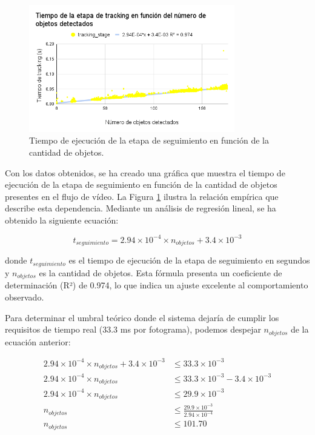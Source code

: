 \documentclass[11pt,spanish,listoffigures,listoftables]{tfgetsinf}
\begin{document}
\begin{figure}[H]
   \centering
   \includegraphics[width=0.8\textwidth]{images/analisis_de_la_solucion/cantidad_objetos/tiempo_etapa_tracking_cantidad_objetos.png}
   \caption{Tiempo de ejecución de la etapa de seguimiento en función de la cantidad de objetos.}
   \label{fig:tiempo_etapa_tracking_cantidad_objetos}
\end{figure}

Con los datos obtenidos, se ha creado una gráfica que muestra el tiempo de ejecución de la etapa de seguimiento en función de la cantidad de objetos presentes en el flujo de vídeo. La Figura \ref{fig:tiempo_etapa_tracking_cantidad_objetos} ilustra la relación empírica que describe esta dependencia. Mediante un análisis de regresión lineal, se ha obtenido la siguiente ecuación:

\begin{equation}
t_{seguimiento} = 2.94 \times 10^{-4} \times n_{objetos} + 3.4 \times 10^{-3}
\end{equation}

donde $t_{seguimiento}$ es el tiempo de ejecución de la etapa de seguimiento en segundos y $n_{objetos}$ es la cantidad de objetos. Esta fórmula presenta un coeficiente de determinación (R²) de 0.974, lo que indica un ajuste excelente al comportamiento observado.

Para determinar el umbral teórico donde el sistema dejaría de cumplir los requisitos de tiempo real (33.3 ms por fotograma), podemos despejar $n_{objetos}$ de la ecuación anterior:

\begin{align}
   2.94 \times 10^{-4} \times n_{objetos} + 3.4 \times 10^{-3} &\leq 33.3 \times 10^{-3} \\
   2.94 \times 10^{-4} \times n_{objetos} &\leq 33.3 \times 10^{-3} - 3.4 \times 10^{-3} \\
   2.94 \times 10^{-4} \times n_{objetos} &\leq 29.9 \times 10^{-3} \\
   n_{objetos} &\leq \frac{29.9 \times 10^{-3}}{2.94 \times 10^{-4}} \\
   n_{objetos} &\leq 101.70
\end{align}
\end{document}
